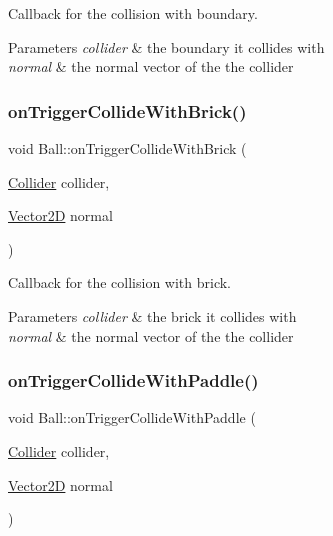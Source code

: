 Callback for the collision with boundary. 


\begin{DoxyParams}{Parameters}
{\em collider} & the boundary it collides with \\
\hline
{\em normal} & the normal vector of the the collider \\
\hline
\end{DoxyParams}
\mbox{\label{class_ball_a5ca1595a6a1d80a8c5c015e013e0aaa2}} 
\subsubsection{\texorpdfstring{on\+Trigger\+Collide\+With\+Brick()}{onTriggerCollideWithBrick()}}
{\footnotesize\ttfamily void Ball\+::on\+Trigger\+Collide\+With\+Brick (\begin{DoxyParamCaption}\item[{\mbox{\hyperlink{class_collider}{Collider}}}]{collider,  }\item[{\mbox{\hyperlink{struct_vector2_d}{Vector2D}}}]{normal }\end{DoxyParamCaption})}



Callback for the collision with brick. 


\begin{DoxyParams}{Parameters}
{\em collider} & the brick it collides with \\
\hline
{\em normal} & the normal vector of the the collider \\
\hline
\end{DoxyParams}
\mbox{\label{class_ball_a9755b22d4718fc8d46850dce8b681749}} 
\subsubsection{\texorpdfstring{on\+Trigger\+Collide\+With\+Paddle()}{onTriggerCollideWithPaddle()}}
{\footnotesize\ttfamily void Ball\+::on\+Trigger\+Collide\+With\+Paddle (\begin{DoxyParamCaption}\item[{\mbox{\hyperlink{class_collider}{Collider}}}]{collider,  }\item[{\mbox{\hyperlink{struct_vector2_d}{Vector2D}}}]{normal }\end{DoxyParamCaption})}




